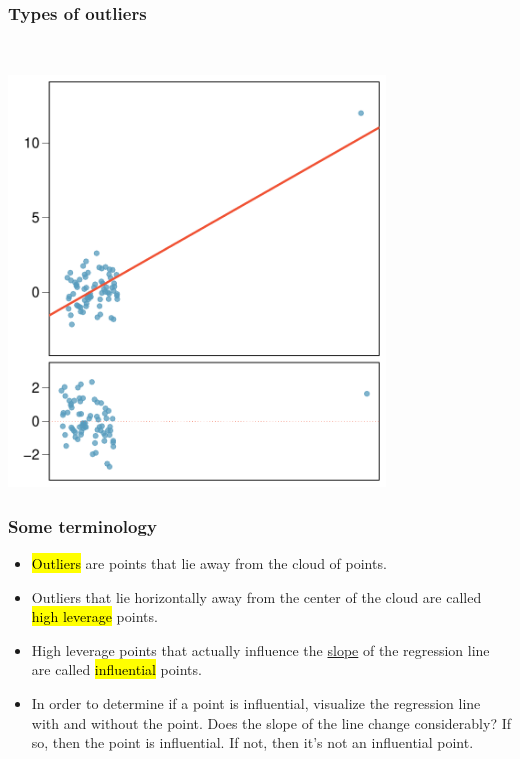 \documentclass[notes,11pt, aspectratio=169]{beamer}
\begin{document}
\begin{frame}
\frametitle{Types of outliers}

{
 \\
}
{
\begin{center}
\includegraphics[width=0.75\textwidth]{graphs/out5}
\end{center}
}

\end{frame}


\begin{frame}
\frametitle{Some terminology}
 
\begin{itemize}

\item \hl{Outliers} are points that lie away from the cloud  of points.

\pause

\item Outliers that lie horizontally away from the center of the cloud are called \hl{high leverage} points.

\pause

\item High leverage points that actually influence the \underline{slope} of the regression line are called \hl{influential} points.

\pause

\item In order to determine if a point is influential, visualize the regression line with and without the point. Does the slope of the line change considerably? If so, then the point is influential. If not, then it's not an influential point.

\end{itemize}

\end{frame}
\end{document}
